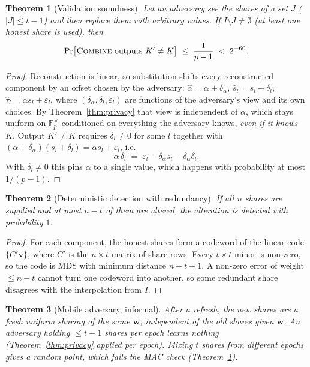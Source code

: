 \documentclass[11pt]{article}
\newtheorem{theorem}{Theorem}
\theoremstyle{remark}
\newcommand{\F}{\mathbb{F}_p}
\newcommand{\vect}[1]{\mathbf{#1}}
\begin{document}
\begin{theorem}[Validation soundness]\label{thm:mac}
Let an adversary see the shares of a set $J$ ($|J|\le t-1$) and then replace
them with arbitrary values. If $I\setminus J\neq\emptyset$ (at least one honest
share is used), then
\[
\Pr\bigl[\textsc{Combine}\text{ outputs }K'\neq K\bigr]\;\le\;\frac{1}{p-1}\;<\;2^{-60}.
\]
\end{theorem}
\begin{proof}
Reconstruction is linear, so substitution shifts every reconstructed component by
an offset chosen by the adversary:
$\hat\alpha=\alpha+\delta_\alpha$, $\hat s_l=s_l+\delta_l$, $\hat\tau_l=\alpha s_l+\varepsilon_l$,
where $(\delta_\alpha,\delta_l,\varepsilon_l)$ are functions of the adversary's view
and its own choices. By Theorem~\ref{thm:privacy} that view is independent of
$\alpha$, which stays uniform on $\F^\times$ conditioned on everything the
adversary knows, \emph{even if it knows $K$}. Output $K'\neq K$ requires
$\delta_l\neq 0$ for some $l$ together with
$(\alpha+\delta_\alpha)(s_l+\delta_l)=\alpha s_l+\varepsilon_l$, i.e.
\[
\alpha\,\delta_l \;=\; \varepsilon_l-\delta_\alpha s_l-\delta_\alpha\delta_l .
\]
With $\delta_l\neq0$ this pins $\alpha$ to a single value, which happens with
probability at most $1/(p-1)$.
\end{proof}

\begin{theorem}[Deterministic detection with redundancy]
If all $n$ shares are supplied and at most $n-t$ of them are altered, the
alteration is detected with probability $1$.
\end{theorem}
\begin{proof}
For each component, the honest shares form a codeword of the linear code
$\{C'\vect v\}$, where $C'$ is the $n \times t$ matrix of share rows. Every
$t\times t$ minor is non-zero, so the code is MDS with minimum distance $n-t+1$.
A non-zero error of weight $\le n-t$ cannot turn one codeword into another, so
some redundant share disagrees with the interpolation from $I$.
\end{proof}

\begin{theorem}[Mobile adversary, informal]
After a refresh, the new shares are a fresh uniform sharing of the same $\vect w$,
independent of the old shares given $\vect w$. An adversary holding $\le t-1$
shares per epoch learns nothing (Theorem~\ref{thm:privacy} applied per epoch).
Mixing $t$ shares from different epochs gives a random point, which fails the MAC
check (Theorem~\ref{thm:mac}).
\end{theorem}
\end{document}
